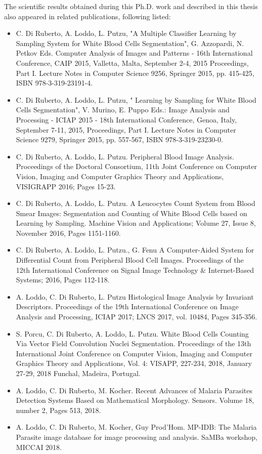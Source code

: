 The scientific results obtained during this Ph.D. work and described in this thesis also appeared in related publications, following listed:
\begin{itemize}
	\item C. Di Ruberto, A. Loddo, L. Putzu, "A Multiple Classifier Learning by Sampling System for White Blood Cells Segmentation", G. Azzopardi, N. Petkov Eds. Computer Analysis of Images and Patterns - 16th International Conference, CAIP 2015, Valletta, Malta, September 2-4, 2015 Proceedings, Part I. Lecture Notes in Computer Science 9256, Springer 2015, pp. 415-425, ISBN 978-3-319-23191-4.
	\item C. Di Ruberto, A. Loddo, L. Putzu, " Learning by Sampling for White Blood Cells Segmentation", V. Murino, E. Puppo Eds.: Image Analysis and Processing - ICIAP 2015 - 18th International Conference, Genoa, Italy, September 7-11, 2015, Proceedings, Part I. Lecture Notes in Computer Science 9279, Springer 2015, pp. 557-567,  ISBN 978-3-319-23230-0. 
	\item C. Di Ruberto, A. Loddo, L. Putzu. Peripheral Blood Image Analysis. Proceedings of the Doctoral Consortium, 11th Joint Conference on Computer Vision, Imaging and Computer Graphics Theory and Applications, VISIGRAPP 2016; Pages 15-23.
	\item C. Di Ruberto, A. Loddo, L. Putzu. A Leucocytes Count System from Blood Smear Images: Segmentation and Counting of White Blood Cells based on Learning by Sampling. Machine Vision and Applications; Volume 27, Issue 8, November 2016, Pages 1151-1160.
	\item C. Di Ruberto, A. Loddo, L. Putzu., G. Fenu A Computer-Aided System for Differential Count from Peripheral Blood Cell Images. Proceedings of the 12th International Conference on Signal Image Technology \& Internet-Based Systems; 2016, Pages 112-118.
	\item A. Loddo, C. Di Ruberto, L. Putzu Histological Image Analysis by Invariant Descriptors. Proceedings of the 19th International Conference on Image Analysis and Processing, ICIAP 2017; LNCS 2017, vol. 10484, Pages 345-356.
	\item S. Porcu, C. Di Ruberto, A. Loddo, L. Putzu. White Blood Cells Counting Via Vector Field Convolution Nuclei Segmentation. Proceedings of the 13th International Joint Conference on Computer Vision, Imaging and Computer Graphics Theory and Applications, Vol. 4: VISAPP, 227-234, 2018, January 27-29, 2018 Funchal, Madeira, Portugal.
	\item A. Loddo, C. Di Ruberto, M. Kocher. Recent Advances of Malaria Parasites Detection Systems Based on Mathematical Morphology. Sensors. Volume 18, number 2, Pages 513, 2018.
	\item A. Loddo, C. Di Ruberto, M. Kocher, Guy Prod'Hom. MP-IDB: The Malaria Parasite image database for image processing and analysis. SaMBa workshop, MICCAI 2018.
\end{itemize}

